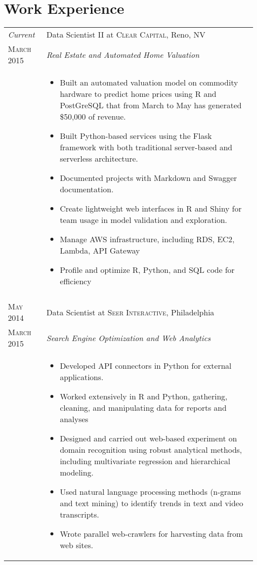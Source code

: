 \documentclass[a4paper,10pt]{article}
\begin{document}
\section{Work Experience}
\begin{longtable}{p{} | p{} }
  \emph{Current} & Data Scientist II at \textsc{Clear Capital}, Reno, NV \\
  \textsc{March 2015}&\emph{Real Estate and Automated Home Valuation}\\
    &\footnotesize{ 
    \begin{itemize}
      \item Built an automated valuation model on commodity hardware to predict home prices using R and PostGreSQL that from March to May has generated \$50,000 of revenue.
      \item Built Python-based services using the Flask framework with both traditional server-based and serverless architecture.
      \item Documented projects with Markdown and Swagger documentation.
      \item Create lightweight web interfaces in R and Shiny for team usage in model validation and exploration.
      \item Manage AWS infrastructure, including RDS, EC2, Lambda, API Gateway
      \item Profile and optimize R, Python, and SQL code for efficiency
  \end{itemize}
    }\\
  \multicolumn{2}{c}{} \\
  \textsc{May 2014} & Data Scientist at \textsc{Seer Interactive}, Philadelphia \\ 
    \textsc{March 2015} &\emph{Search Engine Optimization and Web Analytics}\\ 
      &\footnotesize{ 
      \begin{itemize}
        \item Developed API connectors in Python for external applications. 
        \item Worked extensively in R and Python, gathering, cleaning, and manipulating data for reports and analyses
        \item Designed and carried out web-based experiment on domain recognition using robust analytical methods, including multivariate regression and hierarchical modeling.
        \item Used natural language processing methods (n-grams and text mining) to identify trends in text and video transcripts. 
        \item Wrote parallel web-crawlers for harvesting data from web sites.
      \end{itemize}
    }\\ 

\end{longtable}
\end{document}
